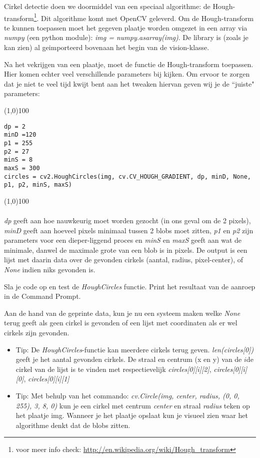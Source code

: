 \documentclass[a4paper]{article}
\begin{document}
Cirkel detectie doen we doormiddel van een speciaal algorithme: de Hough-transform\footnote{voor meer info check: \url{http://en.wikipedia.org/wiki/Hough_transform}}. Dit algorithme komt met OpenCV geleverd. Om de Hough-transform te kunnen toepassen moet het gegeven plaatje worden omgezet in een array via \textit{numpy} (een python module): \textit{img = numpy.asarray(img)}. De library is (zoals je kan zien) al geimporteerd bovenaan het begin van de vision-klasse.

Na het vekrijgen van een plaatje, moet de functie de Hough-transform toepassen. Hier komen echter veel verschillende parameters bij kijken. Om ervoor te zorgen dat je niet te veel tijd kwijt bent aan het tweaken hiervan geven wij je de ``juiste" parameters:

\noindent \line(1,0){100}
\begin{verbatim}
dp = 2
minD =120
p1 = 255
p2 = 27
minS = 8
maxS = 300
circles = cv2.HoughCircles(img, cv.CV_HOUGH_GRADIENT, dp, minD, None, p1, p2, minS, maxS)
\end{verbatim}
\noindent \line(1,0){100}
\\\\
\textit{dp} geeft aan hoe nauwkeurig moet worden gezocht (in ons geval om de 2 pixels), \textit{minD} geeft aan hoeveel pixels minimaal tussen 2 blobs moet zitten, \textit{p1} en \textit{p2} zijn parameters voor een dieper-liggend proces en \textit{minS} en \textit{maxS} geeft aan wat de minimale, danwel de maximale grote van een blob is in pixels.
De output is een lijst met daarin data over de gevonden cirkels (aantal, radius, pixel-center), of \textit{None} indien niks gevonden is.

Sla je code op en test de \textit{HoughCircles} functie. Print het resultaat van de aanroep in de Command Prompt. 

Aan de hand van de geprinte data, kun je nu een systeem maken welke \textit{None} terug geeft als geen cirkel is gevonden of een lijst met coordinaten als er wel cirkels zijn gevonden.

\begin{itemize}
\item Tip: De \textit{HoughCircles}-functie kan meerdere cirkels terug geven. \textit{len(circles[0])} geeft je het aantal gevonden cirkels. De straal en centrum (x en y) van de $i${de} cirkel van de lijst is te vinden met respectievelijk \textit{circles[0][i][2]}, \textit{circles[0][i][0]}, \textit{circles[0][i][1]}
\item Tip: Met behulp van het commando: \textit{cv.Circle(img, center, radius, (0, 0, 255), 3, 8, 0)} kun je een cirkel met centrum \textit{center} en straal \textit{radius} teken op het plaatje img. Wanneer je het plaatje opslaat kun je visueel zien waar het algorithme denkt dat de blobs zitten.
\end{itemize}
\end{document}
